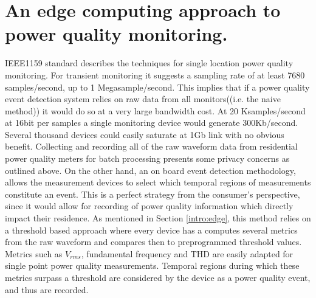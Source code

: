 \section{An edge computing approach to power quality monitoring.}\label{sec:edge-computing-approach-to-power-quality-monitoring.}

IEEE1159 standard describes the techniques for single location power quality monitoring.
For transient monitoring it suggests a sampling rate of at least 7680 samples/second, up to 1 Megasample/second.
This implies that if a power quality event detection system relies on raw data from all monitors((i.e. the naive method)) it would do so at a very large bandwidth cost.
At 20 Ksamples/second at 16bit per samples a single monitoring device would generate 300Kb/second.
Several thousand devices could easily saturate at 1Gb link with no obvious benefit.
Collecting and recording all of the raw waveform data from residential power quality meters for batch processing presents some privacy concerns as outlined above.
On the other hand, an on board event detection methodology, allows the measurement devices to select which temporal regions of measurements constitute an event.
This is a perfect strategy from the consumer's perspective, since it would allow for recording of power quality information which directly impact their residence.
As mentioned in Section \ref{intro:edge}, this method relies on a threshold based approach where every device has a computes several metrics from the raw waveform and compares then to preprogrammed threshold values.
Metrics such as $V_{rms}$, fundamental frequency and THD are easily adapted for single point power quality measurements.
Temporal regions during which these metrics surpass a threshold are considered by the device as a power quality event, and thus are recorded.


